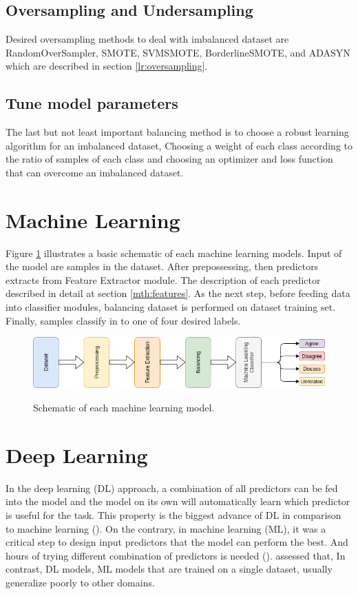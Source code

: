 \subsection{Oversampling and Undersampling}
 Desired oversampling methods to deal with imbalanced dataset are RandomOverSampler, SMOTE, SVMSMOTE, BorderlineSMOTE, and \ac{ADASYN} which are described in section \ref{lr:oversampling}. 

\subsection{Tune model parameters}
 The last but not least important balancing method is to choose a robust learning algorithm for an imbalanced dataset, Choosing a weight of each class according to the ratio of samples of each class and choosing an optimizer and loss function that can overcome an imbalanced dataset.

\section{Machine Learning}
\label{mth:ml}
Figure \ref{fig:mlschm} illustrates a basic schematic of each machine learning models. Input of the model are samples in the dataset. After prepossessing, then predictors extracts from Feature Extractor module. The description of each predictor described in detail at section \ref{mth:features}. As the next step, before feeding data into classifier modules, balancing dataset is performed on dataset training set. Finally, samples classify in to one of four desired labels. 
\begin{figure}%
	\centering
	{\includegraphics[width=14.5cm]{statistics/schema/ml.png} }
	\caption{Schematic of each machine learning model.}%
	\label{fig:mlschm}%
\end{figure}


\section{Deep Learning}
\label{mth:dl}
In the deep learning (\ac{DL}) approach, a combination of all predictors can be fed into the model and the model on its own will automatically learn which predictor is useful for the task. This property is the biggest advance of \ac{DL} in comparison to machine learning (\cite{book_datafake}). On the contrary, in machine learning (\ac{ML}), it was a critical step to design input predictors that the model can perform the best. And hours of trying different combination of predictors is needed (\cite{book_fake}). \cite{stance_robust} assessed that, In contrast, \ac{DL} models, \ac{ML}  models that are trained on a single dataset, usually generalize poorly to other domains.

